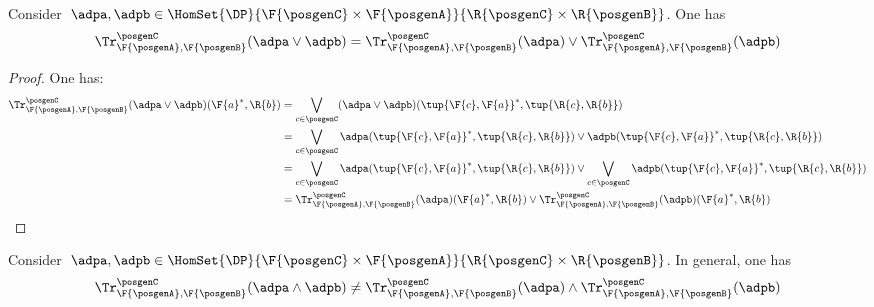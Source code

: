 {\begin{lemma}
    \label{lem:trace_vee}
    Consider~$\adpa,\adpb\in \HomSet{\DP}{\F{\posgenC}\times\F{\posgenA}}{\R{\posgenC} \times\R{\posgenB}}$. One has
    \begin{equation*}
        \Tr_{\F{\posgenA},\F{\posgenB}}^{\posgenC}(\adpa\vee \adpb)=\Tr_{\F{\posgenA},\F{\posgenB}}^{\posgenC}(\adpa)\vee  \Tr_{\F{\posgenA},\F{\posgenB}}^{\posgenC}(\adpb)
    \end{equation*}
\end{lemma}
\begin{proof}
    One has:
    \begin{equation*}
        \begin{aligned}
           \Tr_{\F{\posgenA},\F{\posgenB}}^{\posgenC}(\adpa\vee \adpb)(\F{a}^*,\R{b})&=
            \bigvee_{c\in \posgenC} (\adpa\vee \adpb)(\tup{\F{c},\F{a}}^*,\tup{\R{c},\R{b}})\\
            &=\bigvee_{c\in \posgenC} \adpa(\tup{\F{c},\F{a}}^*,\tup{\R{c},\R{b}})\vee \adpb(\tup{\F{c},\F{a}}^*,\tup{\R{c},\R{b}})\\
            &=\bigvee_{c\in \posgenC} \adpa(\tup{\F{c},\F{a}}^*,\tup{\R{c},\R{b}})\vee \bigvee_{c\in \posgenC} \adpb(\tup{\F{c},\F{a}}^*,\tup{\R{c},\R{b}})\\
            &=\Tr_{\F{\posgenA},\F{\posgenB}}^{\posgenC}(\adpa)(\F{a}^*,\R{b})\vee  \Tr_{\F{\posgenA},\F{\posgenB}}^{\posgenC}(\adpb)(\F{a}^*,\R{b})
        \end{aligned}
    \end{equation*}
\end{proof}

\begin{remark}
    Consider~$\adpa,\adpb\in \HomSet{\DP}{\F{\posgenC}\times\F{\posgenA}}{\R{\posgenC} \times\R{\posgenB}}$. In general, one has
    \begin{equation*}
        \Tr_{\F{\posgenA},\F{\posgenB}}^{\posgenC}(\adpa\wedge \adpb)\neq \Tr_{\F{\posgenA},\F{\posgenB}}^{\posgenC}(\adpa)\wedge  \Tr_{\F{\posgenA},\F{\posgenB}}^{\posgenC}(\adpb)
    \end{equation*}
\end{remark}



}

